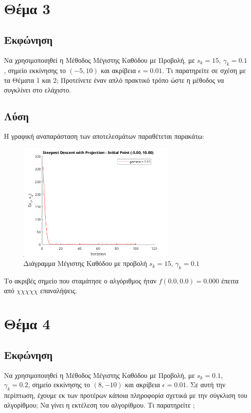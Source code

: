 \documentclass{report}
\begin{document}
\chapter{Θέμα 3}
\section{Εκφώνηση}
Να χρησιμοποιηθεί η Μέθοδος Μέγιστης Καθόδου με Προβολή, με $s_k = 15$, $\gamma_k = 0.1$,
σημείο εκκίνησης το $(-5,10)$ και ακρίβεια $\epsilon = 0.01$. Τι παρατηρείτε σε σχέση με τα Θέματα 1 
και 2; Προτείνετε έναν απλό πρακτικό τρόπο ώστε η 
μέθοδος να συγκλίνει στο ελάχιστο.

\section{Λύση}
Η γραφική αναπαράσταση των αποτελεσμάτων παραθέτεται παρακάτω:
\begin{figure}[H]
    \centering
    \includegraphics[width=0.7\textwidth]{media/thema3.png}
    \caption{Διάγραμμα Μέγιστης Καθόδου με προβολή $s_k = 15$, $\gamma_k = 0.1$}
\end{figure}
Το ακριβές σημείο που σταμάτησε ο αλγόριθμος ήταν $f(0.0, 0.0) = 0.000$ έπειτα από
$χχχχχ$ επαναλήψεις.


\chapter{Θέμα 4}
\section{Εκφώνηση}
Να χρησιμοποιηθεί η Μέθοδος Μέγιστης Καθόδου με Προβολή, με $s_k = 0.1$, $\gamma_k = 0.2$,
σημείο εκκίνησης το $(8, -10)$ και ακρίβεια $\epsilon = 0.01$. Σε αυτή την περίπτωση, έχουμε εκ των
προτέρων κάποια πληροφορία σχετικά με την σύγκλιση του αλγορίθμου;
Να γίνει η εκτέλεση του αλγορίθμου. Τι παρατηρείτε
;
\end{document}
